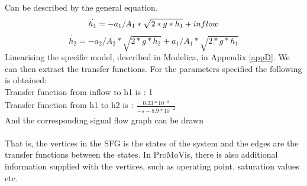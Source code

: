 Can be described by the general equation.
\begin{equation}
    \dot{h_1} = -a_1/A_1*\sqrt{2*g*h_1} + inflow\\\newline
\end{equation}
\begin{equation}
	\dot{h_2} = -a_2/A_2*\sqrt{2*g*h_2} + a_1/A_1*\sqrt{2*g*h_1}
\end{equation}
Linearising the specific model, described in Modelica,  in Appendix \ref{appD}. We can then extract the transfer functions. For the parameters specified the following is obtained:\\\newline
Transfer function from inflow to h1 is : 1\\
Transfer function from h1 to h2 is :$\begin{array}{rcl} \frac{0.23*10^{-2}}{-s -8.9*10^{-2}} \end{array}$\\\newline
And the corresponding signal flow graph  can be drawn\\\newline
{}\\\newline
That is, the vertices in the SFG is the states of the system and the edges are the transfer functions between the states. In ProMoVis, there is also additional information supplied with the vertices, such as operating point, saturation values etc. 